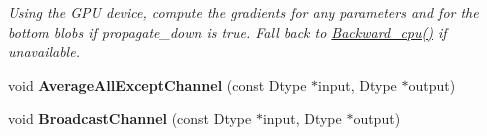 \begin{DoxyCompactItemize}
\begin{DoxyCompactList}\small\item\em Using the G\+PU device, compute the gradients for any parameters and for the bottom blobs if propagate\+\_\+down is true. Fall back to \hyperlink{classcaffe_1_1BNLayer_a87e2372515ba6af62d259a4ec3092c36}{Backward\+\_\+cpu()} if unavailable. \end{DoxyCompactList}\item 
void {\bfseries Average\+All\+Except\+Channel} (const Dtype $\ast$input, Dtype $\ast$output)\hypertarget{classcaffe_1_1BNLayer_a99b57558b3db590d6c7b6c2329c81b3b}{}\label{classcaffe_1_1BNLayer_a99b57558b3db590d6c7b6c2329c81b3b}

\item 
void {\bfseries Broadcast\+Channel} (const Dtype $\ast$input, Dtype $\ast$output)\hypertarget{classcaffe_1_1BNLayer_ad01ff398af7bb3b2cfbfa91505b9ef31}{}\label{classcaffe_1_1BNLayer_ad01ff398af7bb3b2cfbfa91505b9ef31}

\end{DoxyCompactItemize}
